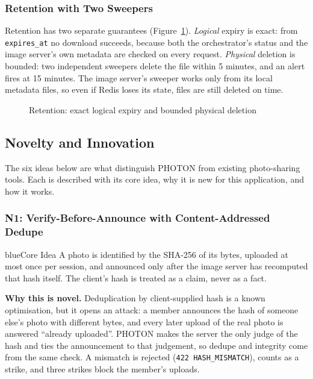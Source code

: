 \subsubsection{Retention with Two Sweepers}

Retention has two separate guarantees (Figure~\ref{fig:retention}). \emph{Logical} expiry is exact: from \texttt{expires\_at} no download succeeds, because both the orchestrator's status and the image server's own metadata are checked on every request. \emph{Physical} deletion is bounded: two independent sweepers delete the file within 5 minutes, and an alert fires at 15 minutes. The image server's sweeper works only from its local metadata files, so even if Redis loses its state, files are still deleted on time.

\begin{figure}[H]
\centering
{}
\caption{Retention: exact logical expiry and bounded physical deletion}\label{fig:retention}
\end{figure}

\subsection{Novelty and Innovation}\label{sec:novelty}

The six ideas below are what distinguish PHOTON from existing photo-sharing tools. Each is described with its core idea, why it is new for this application, and how it works.

\subsubsection{N1: Verify-Before-Announce with Content-Addressed Dedupe}

\begin{pbox}{blue}{Core Idea}
A photo is identified by the SHA-256 of its bytes, uploaded at most once per session, and announced only after the image server has recomputed that hash itself. The client's hash is treated as a claim, never as a fact.
\end{pbox}

\textbf{Why this is novel.} Deduplication by client-supplied hash is a known optimisation, but it opens an attack: a member announces the hash of someone else's photo with different bytes, and every later upload of the real photo is answered ``already uploaded''. PHOTON makes the server the only judge of the hash and ties the announcement to that judgement, so dedupe and integrity come from the same check. A mismatch is rejected (\texttt{422 HASH\_MISMATCH}), counts as a strike, and three strikes block the member's uploads.

